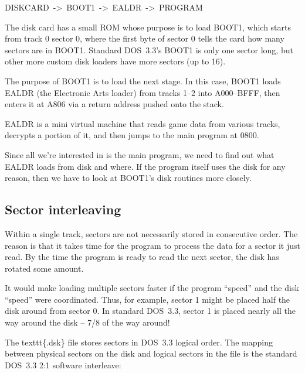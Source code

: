 \documentclass[10pt]{report}
\begin{document}
{\Tt{}DISKCARD\ ->\ BOOT1\ ->\ EALDR\ ->\ PROGRAM\nwendquote}

The disk card has a small ROM whose purpose is to load {\Tt{}BOOT1\nwendquote}, which starts from
track 0 sector 0, where the first byte of sector 0 tells the card how many sectors are in {\Tt{}BOOT1\nwendquote}. Standard {\Tt{}DOS\ 3.3\nwendquote}'s {\Tt{}BOOT1\nwendquote} is only one sector long, but other more custom
disk loaders have more sectors (up to 16).

The purpose of {\Tt{}BOOT1\nwendquote} is to load the next stage. In this case, {\Tt{}BOOT1\nwendquote} loads
{\Tt{}EALDR\nwendquote} (the Electronic Arts loader) from tracks 1--2 into {\Tt{}{\$}A000\nwendquote}--{\Tt{}{\$}BFFF\nwendquote},
then enters it at {\Tt{}{\$}A806\nwendquote} via a return address pushed onto the stack.

{\Tt{}EALDR\nwendquote} is a mini virtual machine that reads game data from various tracks,
decrypts a portion of it, and then jumps to the main program at {\Tt{}{\$}0800\nwendquote}.

Since all we're interested in is the main program, we need to find out what
{\Tt{}EALDR\nwendquote} loads from disk and where. If the program itself uses the
disk for any reason, then we have to look at {\Tt{}BOOT1\nwendquote}'s disk routines more closely.

\subsection{Sector interleaving}

Within a single track, sectors are not necessarily stored in consecutive order.
The reason is that it takes time for the program to process the data for a
sector it just read. By the time the program is ready to read the next sector,
the disk has rotated some amount.

It would make loading multiple sectors faster if the program ``speed'' and the
disk ``speed'' were coordinated. Thus, for example, sector 1 might be placed
half the disk around from sector 0. In standard {\Tt{}DOS\ 3.3\nwendquote}, sector 1 is placed
nearly all the way around the disk -- {\Tt{}7/8\nwendquote} of the way around!

The {\Tt{}{\textbackslash}texttt\{.dsk\}\nwendquote} file stores sectors in {\Tt{}DOS\ 3.3\nwendquote} logical order. The mapping
between physical sectors on the disk and logical sectors in the file is the
standard {\Tt{}DOS\ 3.3\nwendquote} 2:1 software interleave:
\end{document}
